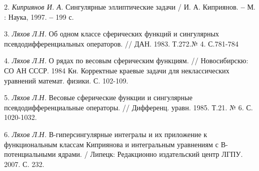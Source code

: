 2. {\it Киприянов И. А.} Сингулярные эллиптические задачи / И. А. Киприянов.
{\bf --} М. : Наука, 1997. {\bf --}  199 с.

3. {\it Ляхов Л.Н.} Об одном классе сферических функций и сингулярных псевдодифференциальных операторов. // ДАН. 1983. Т.272.№ 4. С.781-784

4. {\it Ляхов Л.Н.} О рядах по весовым сферическим функциям. //
Новосибирскю: СО АН СССР. 1984
Кн. Корректные краевые задачи для неклассических уравнений математ. физики. С. 102-109.

5. {\it Ляхов Л.Н.} Весовые сферические функции и сингулярные псевдодифференциальные операторы.
// Дифференц. уравн. 1985. Т.21. № 6. С. 1020-1032.

6. {\it Ляхов Л.Н. }
В-гиперсингулярные интегралы и их приложение к функциональным классам Киприянова и интегральным уравнениям с В-потенциальными ядрами.
/ Липецк: Редакционно издательский центр ЛГПУ. 2007. С. 232.




